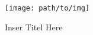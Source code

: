 \begin{figure}[H]
\centering
\texttt{[image: path/to/img]}
\caption{Inser Titel Here}
\label{fig:name_of_figure}
\end{figure}
